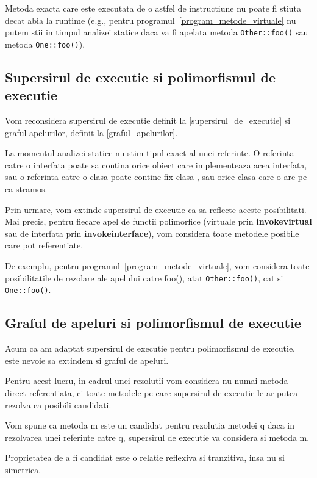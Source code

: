 Metoda exacta care este executata de o astfel de instructiune nu poate fi stiuta
decat abia la runtime (e.g., pentru programul~\ref{program_metode_virtuale}
nu putem stii in timpul analizei statice daca va fi apelata metoda
\texttt{Other::foo()} sau metoda \texttt{One::foo()}).

\subsection{Supersirul de executie si polimorfismul de executie}

Vom reconsidera supersirul de executie definit la \ref{supersirul_de_executie}
si graful apelurilor, definit la \ref{graful_apelurilor}.

La momentul analizei statice nu stim tipul exact al unei referinte.
O referinta catre o interfata poate sa contina orice obiect care implementeaza
acea interfata, sau o referinta catre o clasa  poate contine fix clasa
, sau orice clasa care o are pe  ca stramos.

Prin urmare, vom extinde supersirul de executie ca sa reflecte aceste
posibilitati.
Mai precis, pentru fiecare apel de functii polimorfice (virtuale prin
\textbf{invokevirtual} sau de interfata prin \textbf{invokeinterface}), vom
considera toate metodele posibile care pot referentiate.

De exemplu, pentru programul~\ref{program_metode_virtuale}, vom considera toate
posibilitatile de rezolare ale apelului catre foo(), atat \texttt{Other::foo()},
cat si \texttt{One::foo()}.

\subsection{Graful de apeluri si polimorfismul de executie}

Acum ca am adaptat supersirul de executie pentru polimorfismul de executie, este
nevoie sa extindem si graful de apeluri.

Pentru acest lucru, in cadrul unei rezolutii vom considera nu numai metoda
direct referentiata, ci toate metodele pe care supersirul de executie le-ar
putea rezolva ca posibili candidati.

Vom spune ca metoda m este un candidat pentru rezolutia metodei q daca in
rezolvarea unei referinte catre q, supersirul de executie va considera si metoda
m.

Proprietatea de a fi candidat este o relatie reflexiva si tranzitiva, insa nu si
simetrica.

